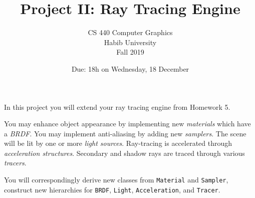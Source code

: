 \documentclass[addpoints]{exam}
\title{Project II: Ray Tracing Engine}
\author{CS 440 Computer Graphics\\Habib University\\Fall 2019}
\date{Due: 18h on Wednesday, 18 December}
\begin{document}
\maketitle
\thispagestyle{empty}

In this project you will extend your ray tracing engine from Homework 5.

You may enhance object appearance by implementing new \emph{materials} which have a \emph{BRDF}. You may implement anti-aliasing by adding new \textit{samplers}. The scene will be lit by one or more \emph{light sources}. Ray-tracing is accelerated through \textit{acceleration structures}. Secondary and shadow rays are traced through various \textit{tracers}.

You will correspondingly derive new classes from \texttt{Material} and \texttt{Sampler}, construct new hierarchies for \texttt{BRDF}, \texttt{Light}, \texttt{Acceleration}, and \texttt{Tracer}.
\end{document}
